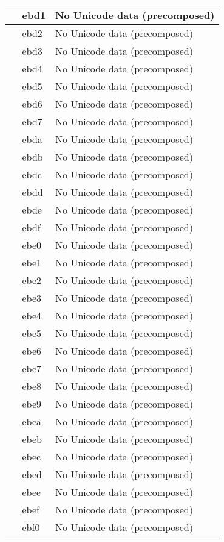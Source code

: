 \documentclass[12pt,letterpaper,openany]{book}
\begin{document}
\begin{center}
\begin{supertabular}{|m{0.25in}|m{0.5in}|m{4in}|}
 & ebd1 & No Unicode data (precomposed)\\\hline
 & ebd2 & No Unicode data (precomposed)\\\hline
 & ebd3 & No Unicode data (precomposed)\\\hline
 & ebd4 & No Unicode data (precomposed)\\\hline
 & ebd5 & No Unicode data (precomposed)\\\hline
 & ebd6 & No Unicode data (precomposed)\\\hline
 & ebd7 & No Unicode data (precomposed)\\\hline
 & ebda & No Unicode data (precomposed)\\\hline
 & ebdb & No Unicode data (precomposed)\\\hline
 & ebdc & No Unicode data (precomposed)\\\hline
 & ebdd & No Unicode data (precomposed)\\\hline
 & ebde & No Unicode data (precomposed)\\\hline
 & ebdf & No Unicode data (precomposed)\\\hline
 & ebe0 & No Unicode data (precomposed)\\\hline
 & ebe1 & No Unicode data (precomposed)\\\hline
 & ebe2 & No Unicode data (precomposed)\\\hline
 & ebe3 & No Unicode data (precomposed)\\\hline
 & ebe4 & No Unicode data (precomposed)\\\hline
 & ebe5 & No Unicode data (precomposed)\\\hline
 & ebe6 & No Unicode data (precomposed)\\\hline
 & ebe7 & No Unicode data (precomposed)\\\hline
 & ebe8 & No Unicode data (precomposed)\\\hline
 & ebe9 & No Unicode data (precomposed)\\\hline
 & ebea & No Unicode data (precomposed)\\\hline
 & ebeb & No Unicode data (precomposed)\\\hline
 & ebec & No Unicode data (precomposed)\\\hline
 & ebed & No Unicode data (precomposed)\\\hline
 & ebee & No Unicode data (precomposed)\\\hline
 & ebef & No Unicode data (precomposed)\\\hline
 & ebf0 & No Unicode data (precomposed)\\\hline

\end{supertabular}
\end{center}
\end{document}
